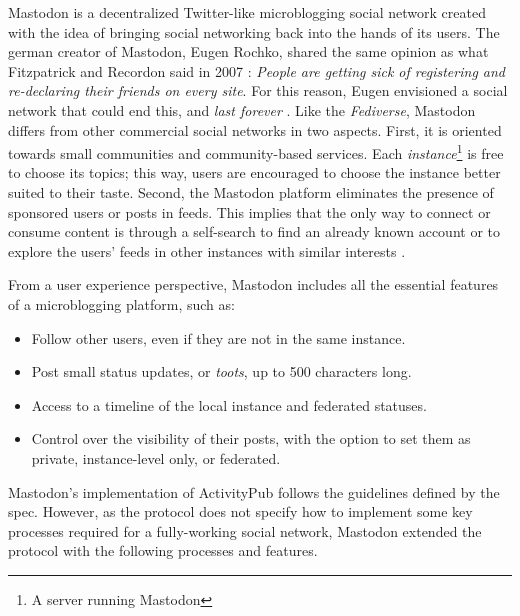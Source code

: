  Mastodon is a decentralized Twitter-like microblogging social network created with the idea of bringing social networking back into the hands of its users. The german creator of Mastodon, Eugen Rochko, shared the same opinion as what Fitzpatrick and Recordon said in 2007 \cite{fitzpatrick_recordon_2007}: \emph{People are getting sick of registering and re-declaring their friends on every site}. For this reason, Eugen envisioned a social network that could end this, and \emph{last forever} \cite{tilley_2018}. Like the \emph{Fediverse}, Mastodon differs from other commercial social networks in two aspects. First, it is oriented towards small communities and community-based services. Each \emph{instance}\footnote{A server running Mastodon} is free to choose its topics; this way, users are encouraged to choose the instance better suited to their taste. Second, the Mastodon platform eliminates the presence of sponsored users or posts in feeds. This implies that the only way to connect or consume content is through a self-search to find an already known account or to explore the users' feeds in other instances with similar interests \cite{8845221}. 
 
 From a user experience perspective, Mastodon includes all the essential features of a microblogging platform, such as:

\begin{itemize}
  \item Follow other users, even if they are not in the same instance. 
  \item Post small status updates, or \emph{toots}, up to 500 characters long. 
  \item Access to a timeline of the local instance and federated statuses. 
  \item Control over the visibility of their posts, with the option to set them as private, instance-level only, or federated. 
\end{itemize}

Mastodon's implementation of ActivityPub follows the guidelines defined by the spec. However, as the protocol does not specify how to implement some key processes required for a fully-working social network, Mastodon extended the protocol with the following processes and features.


